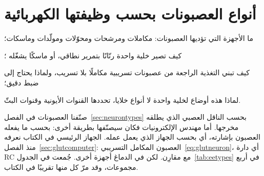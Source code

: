 \chapter{أنواع العصبونات بحسب وظيفتها الكهربائية}
\label{sec:eetypes}
\begin{chaptergoals}
\item ما الأجهزة التي تؤديها العصبونات: مكاملات ومرشحات ومحوّلات ومولّدات وماسكات؛
\item كيف تصير خلية واحدة رنّانًا بتمرير نطاقي، أو ماسكًا يشغّله ؛
\item كيف تبني التغذية الراجعة من عصبونات تسريبية مكاملًا بلا تسريب، ولماذا يحتاج إلى ضبط دقيق؛
\item لماذا هذه أوضاع لخلية واحدة لا أنواع خلايا، تحددها القنوات الأيونية وقنوات البثّ.
\end{chaptergoals}

صنّفنا العصبونات في الفصل~\ref{sec:neurontypes} بحسب الناقل العصبي الذي يطلقه مخرجها. أما مهندس الإلكترونيات فكان سيصنّفها بطريقة أخرى: بحسب ما يفعله العصبون بإشارته، أي بحسب الجهاز الذي يعمل عمله. الجهاز الرئيسي في الكتاب نعرفه منذ الفصل~\ref{sec:glutcomputer}: العصبون المكامل التسريبي~\eqref{eq:glutneuron}، أي دارة RC مع مقارِن. لكن في الدماغ أجهزة أخرى. جُمعت في الجدول~\ref{tab:eetypes} في أربع مجموعات، وقد مرّ كل منها تقريبًا في الكتاب.

